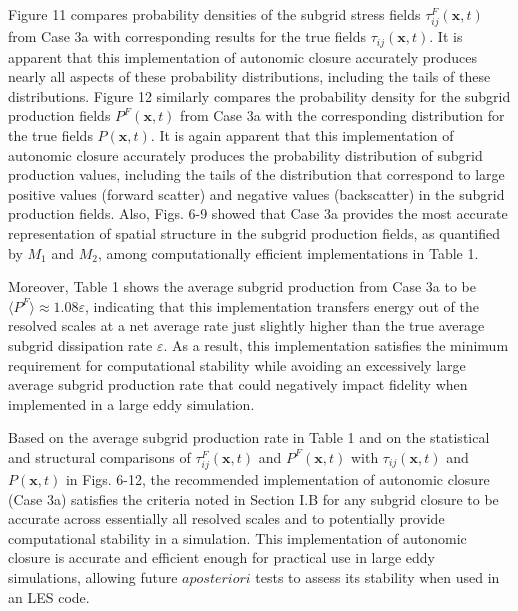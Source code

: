 Figure 11 compares probability densities of the subgrid stress fields $\tau_{ij}^{F}(\mathbf{x},t)$  from Case 3a with corresponding results for the true fields $\tau_{ij}(\mathbf{x},t)$. It is apparent that this implementation of autonomic closure accurately produces nearly all aspects of these probability distributions, including the tails of these distributions. Figure 12 similarly compares the probability density for the subgrid production fields $P^{F}(\mathbf{x},t)$  from Case 3a with the corresponding distribution for the true fields $P(\mathbf{x},t)$. It is again apparent that this implementation of autonomic closure accurately produces the probability distribution of subgrid production values, including the tails of the distribution that correspond to large positive values (forward scatter) and negative values (backscatter) in the subgrid production fields. Also, Figs. 6-9 showed that Case 3a provides the most accurate representation of spatial structure in the subgrid production fields, as quantified by  $M_1$ and $M_2$, among computationally efficient implementations in Table 1. 

Moreover, Table 1 shows the average subgrid production from Case 3a to be $\langle P^F \rangle \approx 1.08 \varepsilon$, indicating that this implementation transfers energy out of the resolved scales at a net average rate just slightly higher than the true average subgrid dissipation rate $\varepsilon$. As a result, this implementation satisfies the minimum requirement for computational stability while avoiding an excessively large average subgrid production rate that could negatively impact fidelity when implemented in a large eddy simulation.

Based on the average subgrid production rate in Table 1 and on the statistical and structural comparisons of  $\tau_{ij}^{F}(\mathbf{x},t)$ and $P^{F}(\mathbf{x},t)$  with  $\tau_{ij}(\mathbf{x},t)$ and  $P(\mathbf{x},t)$ in Figs. 6-12, the recommended implementation of autonomic closure (Case 3a) satisfies the criteria noted in Section I.B for any subgrid closure to be accurate across essentially all resolved scales and to potentially provide computational stability in a simulation. This implementation of autonomic closure is accurate and efficient enough for practical use in large eddy simulations, allowing future $a posteriori$ tests to assess its stability when used in an LES code.




